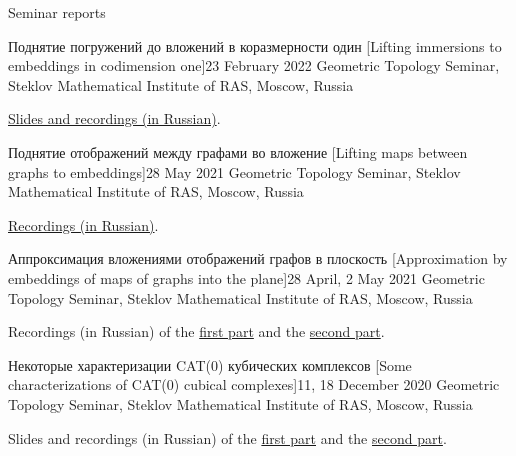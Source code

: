 \documentclass{resume}
\begin{document}
\begin{rSection}{Seminar reports}
  \begin{rSubsection}{Поднятие погружений до вложений в коразмерности один [Lifting immersions to embeddings in codimension one]}{23 February 2022}{}
    Geometric Topology Seminar, Steklov Mathematical Institute of RAS, Moscow, Russia
    \vspace{0.5em}

    \href{http://www.mathnet.ru/php/seminars.phtml?option_lang=eng&presentid=34048}{Slides and recordings (in Russian)}.
  \end{rSubsection}

  \begin{rSubsection}{Поднятие отображений между графами во вложение [Lifting maps between graphs to embeddings]}{28 May 2021}{}
    Geometric Topology Seminar, Steklov Mathematical Institute of RAS, Moscow, Russia
    \vspace{0.5em}

    \href{http://www.mathnet.ru/php/seminars.phtml?option_lang=eng&presentid=30731}{Recordings (in Russian)}.
  \end{rSubsection}

  \begin{rSubsection}{Аппроксимация вложениями отображений графов в плоскость [Approximation by embeddings of maps of graphs into the plane]}{28 April, 2 May 2021}{}
    Geometric Topology Seminar, Steklov Mathematical Institute of RAS, Moscow, Russia
    \vspace{0.5em}

    Recordings (in Russian) of the
    \href{http://www.mathnet.ru/php/seminars.phtml?option_lang=eng&presentid=30406}{first part} and
    the \href{http://www.mathnet.ru/php/seminars.phtml?option_lang=eng&presentid=30482}{second part}.
  \end{rSubsection}

  \begin{rSubsection}{Некоторые характеризации CAT(0) кубических комплексов [Some characterizations
      of CAT(0) cubical complexes]}{11, 18 December 2020}{}
    Geometric Topology Seminar, Steklov Mathematical Institute of RAS, Moscow, Russia
    \vspace{0.5em}

    Slides and recordings (in Russian) of the
    \href{http://www.mathnet.ru/php/seminars.phtml?option_lang=eng&presentid=28954}{first part} and
    the \href{http://www.mathnet.ru/php/seminars.phtml?option_lang=eng&presentid=29250}{second part}.
  \end{rSubsection}


\end{rSection}
\end{document}
